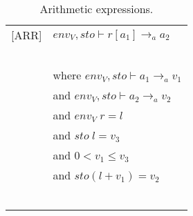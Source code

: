 \begin{longtable}{l l}
[ARR] & $env_V, sto \vdash r[a_1] \rightarrow_a a_2$ \\
~ & ~ \\
~ & \indent\indent where $env_V, sto \vdash a_1 \rightarrow_a v_1$ \\
~ & \indent\indent and $env_V, sto \vdash a_2 \rightarrow_a v_2$ \\
~ & \indent\indent and $env_V \; r = l$ \\
~ & \indent\indent and $sto \; l = v_3$ \\
~ & \indent\indent and $0 < v_1 \leq v_3$ \\
~ & \indent\indent and $sto(l + v_1) = v_2$ \\
~ & ~ \\
\caption{Arithmetic expressions.}
\end{longtable}

